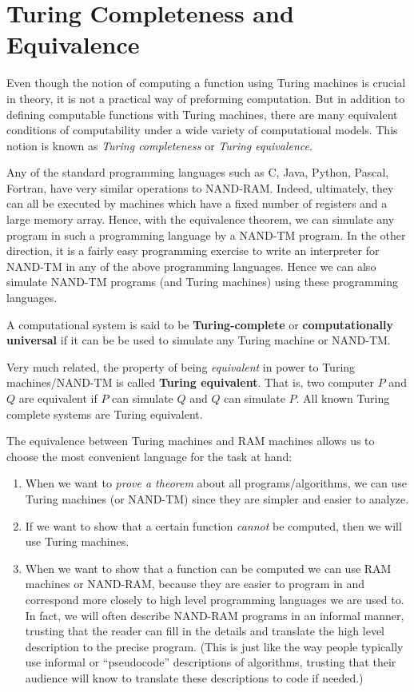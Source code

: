 \documentclass{article}
\begin{document}
\section{Turing Completeness and Equivalence}

  Even though the notion of computing a function using Turing machines is crucial in theory, it is not a practical way of preforming computation. But in addition to defining computable functions with Turing machines, there are many equivalent conditions of computability under a wide variety of computational models. This notion is known as \textit{Turing completeness} or \textit{Turing equivalence}. 

  Any of the standard programming languages such as C, Java, Python, Pascal, Fortran, have very similar operations to NAND-RAM. Indeed, ultimately, they can all be executed by machines which have a fixed number of registers and a large memory array. Hence, with the equivalence theorem, we can simulate any program in such a programming language by a NAND-TM program. In the other direction, it is a fairly easy programming exercise to write an interpreter for NAND-TM in any of the above programming languages. Hence we can also simulate NAND-TM programs (and Turing machines) using these programming languages. 

  \begin{definition}
  A computational system is said to be \textbf{Turing-complete} or \textbf{computationally universal} if it can be be used to simulate any Turing machine or NAND-TM. 

  Very much related, the property of being \textit{equivalent} in power to Turing machines/NAND-TM is called \textbf{Turing equivalent}. That is, two computer $P$ and $Q$ are equivalent if $P$ can simulate $Q$ and $Q$ can simulate $P$. All known Turing complete systems are Turing equivalent. 
  \end{definition}

  The equivalence between Turing machines and RAM machines allows us to choose the most convenient language for the task at hand: 
  \begin{enumerate}
      \item When we want to \textit{prove a theorem} about all programs/algorithms, we can use Turing machines (or NAND-TM) since they are simpler and easier to analyze. 
      \item If we want to show that a certain function \textit{cannot} be computed, then we will use Turing machines. 
      \item When we want to show that a function can be computed we can use RAM machines or NAND-RAM, because they are easier to program in and correspond more closely to high level programming languages we are used to. In fact, we will often describe NAND-RAM programs in an informal manner, trusting that the reader can fill in the details and translate the high level description to the precise program. (This is just like the way people typically use informal or “pseudocode” descriptions of algorithms, trusting that their audience will know to translate these descriptions to code if needed.)
  \end{enumerate}
\end{document}
